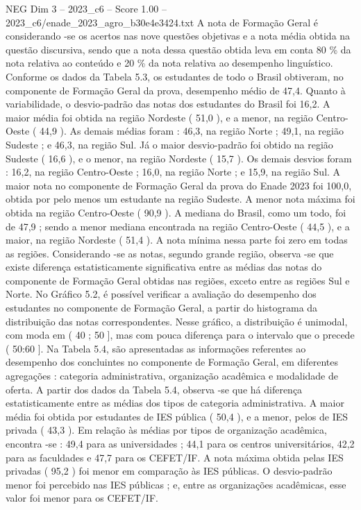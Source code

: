 \begin{textsample}{NEG Dim 3 – 2023\_c6 – Score 1.00 – 2023\_c6/enade\_2023\_agro\_b30e4e3424.txt}
A nota de Formação Geral é considerando -se os acertos nas nove questões objetivas e a nota média obtida na questão discursiva, sendo que a nota dessa questão obtida leva em conta 80 \% da nota relativa ao conteúdo e 20 \% da nota relativa ao desempenho linguístico.
Conforme os dados da Tabela 5.3, os estudantes de todo o Brasil obtiveram, no componente de Formação Geral da prova, desempenho médio de 47,4.
Quanto à variabilidade, o desvio-padrão das notas dos estudantes do Brasil foi 16,2.
A maior média foi obtida na região Nordeste ( 51,0 ), e a menor, na região Centro-Oeste ( 44,9 ).
As demais médias foram : 46,3, na região Norte ; 49,1, na região Sudeste ; e 46,3, na região Sul.
Já o maior desvio-padrão foi obtido na região Sudeste ( 16,6 ), e o menor, na região Nordeste ( 15,7 ).
Os demais desvios foram : 16,2, na região Centro-Oeste ; 16,0, na região Norte ; e 15,9, na região Sul.
A maior nota no componente de Formação Geral da prova do Enade 2023 foi 100,0, obtida por pelo menos um estudante na região Sudeste.
A menor nota máxima foi obtida na região Centro-Oeste ( 90,9 ).
A mediana do Brasil, como um todo, foi de 47,9 ; sendo a menor mediana encontrada na região Centro-Oeste ( 44,5 ), e a maior, na região Nordeste ( 51,4 ).
A nota mínima nessa parte foi zero em todas as regiões.
Considerando -se as notas, segundo grande região, observa -se que existe diferença estatisticamente significativa entre as médias das notas do componente de Formação Geral obtidas nas regiões, exceto entre as regiões Sul e Norte.
No Gráfico 5.2, é possível verificar a avaliação do desempenho dos estudantes no componente de Formação Geral, a partir do histograma da distribuição das notas correspondentes.
Nesse gráfico, a distribuição é unimodal, com moda em ( 40 ; 50 ], mas com pouca diferença para o intervalo que o precede ( 50:60 ].
Na Tabela 5.4, são apresentadas as informações referentes ao desempenho dos concluintes no componente de Formação Geral, em diferentes agregações : categoria administrativa, organização acadêmica e modalidade de oferta.
A partir dos dados da Tabela 5.4, observa -se que há diferença estatisticamente entre as médias dos tipos de categoria administrativa.
A maior média foi obtida por estudantes de IES pública ( 50,4 ), e a menor, pelos de IES privada ( 43,3 ).
Em relação às médias por tipos de organização acadêmica, encontra -se : 49,4 para as universidades ; 44,1 para os centros universitários, 42,2 para as faculdades e 47,7 para os CEFET/IF.
A nota máxima obtida pelas IES privadas ( 95,2 ) foi menor em comparação às IES públicas.
O desvio-padrão menor foi percebido nas IES públicas ; e, entre as organizações acadêmicas, esse valor foi menor para os CEFET/IF.

\end{textsample}
